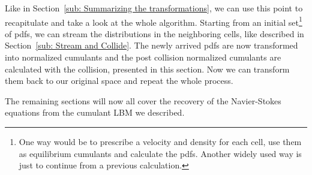 
Like in Section~\ref{sub: Summarizing the transformations}, we can use this point to recapitulate and take a look at the whole algorithm.
Starting from an initial set\footnote{
One way would be to prescribe a velocity and density for each cell, use them as equilibrium cumulants and calculate the \glspl{pdf}.
Another widely used way is just to continue from a previous calculation.
} of \glspl{pdf}, we can stream the distributions in the neighboring cells, like described in Section~\ref{sub: Stream and Collide}.
The newly arrived \glspl{pdf} are now transformed into normalized cumulants and the post collision normalized cumulants are calculated with the collision, presented in this section.
Now we can transform them back to our original space and repeat the whole process.

The remaining sections will now all cover the recovery of the Navier-Stokes equations from the cumulant LBM we described.
